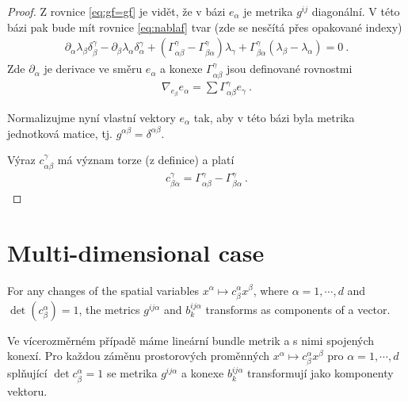 \begin{proof}
    Z rovnice \eqref{eq:gf=gf} je vidět, že v bázi $e_\alpha$ je metrika $g^{ij}$ diagonální. 
    V této bázi pak bude mít rovnice \eqref{eq:nablaf} tvar (zde se nesčítá přes opakované indexy)
    \begin{align}
        \partial_\alpha \lambda_\beta \delta_\beta^\gamma - \partial_\beta \lambda_\alpha \delta_\alpha^\gamma + (\Gamma_{\alpha \beta}^\gamma - \Gamma_{\beta \alpha}^\gamma ) \lambda_\gamma + \Gamma_{\beta \alpha}^\gamma (\lambda_\beta - \lambda_\alpha) = 0 \:.
    \end{align}
    Zde $\partial_\alpha$ je derivace ve směru $e_\alpha$ a konexe $\Gamma_{\alpha \beta}^\gamma$ jsou definované rovnostmi
    \begin{align}
        \nabla_{e_\beta} e_\alpha = \sum \Gamma^\gamma_{\alpha \beta} e_\gamma \:.
    \end{align}

    Normalizujme nyní vlastní vektory $e_\alpha$ tak, aby v této bázi byla metrika jednotková matice, tj. $g^{\alpha \beta} = \delta^{\alpha \beta}$.

    Výraz $c^\gamma_{\alpha \beta}$ má význam torze (z definice) a platí
    \begin{align}
        c^\gamma_{\beta \alpha} = \Gamma^\gamma_{\alpha \beta} - \Gamma^\gamma_{\beta \alpha} \:.
    \end{align} 

\end{proof}


\section{Multi-dimensional case}

\begin{proposition}
    For any changes of the spatial variables $x^ \alpha \mapsto c^\alpha_\beta x^\beta$, where $\alpha = 1, \cdots, d$ and $\det (c^\alpha_\beta) = 1$, the metrics $g^{ij \alpha}$ and $b^{ij \alpha}_k$ transforms as components of a vector.
\end{proposition}



Ve vícerozměrném případě máme lineární bundle metrik a s nimi spojených konexí. Pro každou záměnu prostorových proměnných $x^\alpha \mapsto c^\alpha_\beta x^\beta$ pro $\alpha = 1, \cdots, d$ splňující $\det c^\alpha_\beta = 1$ se metrika $g^{ij \alpha}$ a konexe $b^{ij \alpha}_k$ transformují jako komponenty vektoru.

